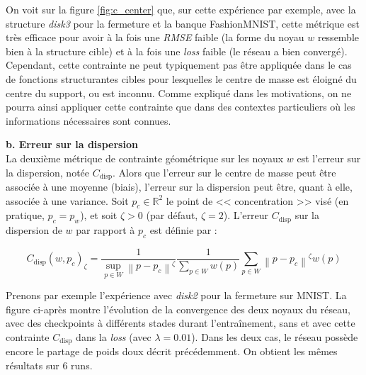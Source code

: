 \vspace{-0.2mm}
\noindent On voit sur la figure \ref{fig:c_center} que, sur cette expérience par exemple, avec la structure \textit{disk3} pour la fermeture et la banque FashionMNIST, cette métrique est très efficace pour avoir à la fois une \textit{RMSE} faible (la forme du noyau $w$ ressemble bien à la structure cible) et à la fois une \textit{loss} faible (le réseau a bien convergé).
Cependant, cette contrainte ne peut typiquement pas être appliquée dans le cas de fonctions structurantes cibles pour lesquelles le centre de masse est éloigné du centre du support, ou est inconnu. Comme expliqué dans les motivations, on ne pourra ainsi appliquer cette contrainte que dans des contextes particuliers où les informations nécessaires sont connues. \\



\newpage

\noindent \textbf{b. Erreur sur la dispersion}\\

La deuxième métrique de contrainte géométrique sur les noyaux $w$ est l'erreur sur la dispersion, notée $C_\text{disp}$. Alors que l'erreur sur le centre de masse peut être associée à une moyenne (biais), l'erreur sur la dispersion peut être, quant à elle, associée à une variance. Soit $p_c \in \mathbb{R}^2$ le point de << concentration >> visé (en pratique, $p_c = p_w$), et soit $\zeta > 0$ (par défaut, $\zeta = 2$). L'erreur $C_\text{disp}$ sur la dispersion de $w$ par rapport à $p_c$ est définie par :

\vspace{-1.4mm}
\begin{equation}
    C_\text{disp}(w, p_c)_\zeta = \frac{ 1 }{ \sup_{p \in W} \left \| p - p_c \right \| ^\zeta } \frac{ 1 }{ \sum_{p \in W} w(p) } \sum_{p \in W} \left \| p - p_c \right \| ^\zeta w(p)
    \label{erreur_disp}
\end{equation}

\vspace{4.6mm}

\noindent Prenons par exemple l'expérience avec \textit{disk2} pour la fermeture sur MNIST. La figure ci-après montre l'évolution de la convergence des deux noyaux du réseau, avec des checkpoints à différents stades durant l'entraînement, sans et avec cette contrainte $C_\text{disp}$ dans la \textit{loss} (avec $\lambda = 0.01$). Dans les deux cas, le réseau possède encore le partage de poids doux décrit précédemment. On obtient les mêmes résultats sur 6 runs. \\

